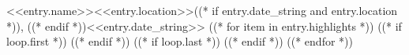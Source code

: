 \resumeNormalSubheading
    {<<entry.name>>}{<<entry.location>>((* if entry.date_string and entry.location *)), ((* endif *))<<entry.date_string>>}
((* for item in entry.highlights *))
    ((* if loop.first *))
    \resumeItemListStart
    ((* endif *))
    ((* if loop.last *))
    \resumeItemListEnd
    ((* endif *))
((* endfor *))